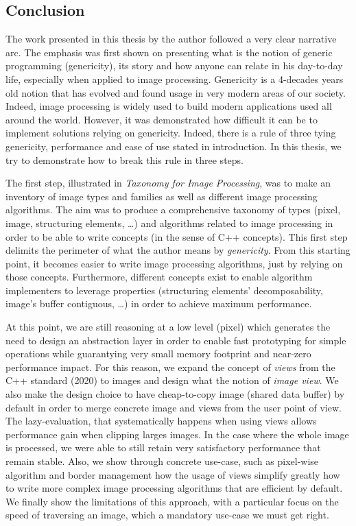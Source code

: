 \subsection*{Conclusion}


The work presented in this thesis by the author followed a very clear narrative arc. The emphasis was first shown on
presenting what is the notion of generic programming (genericity), its story and how anyone can relate in his day-to-day
life, especially when applied to image processing. Genericity is a 4-decades years old notion that has evolved and found
usage in very modern areas of our society. Indeed, image processing is widely used to build modern applications used all
around the world. However, it was demonstrated how difficult it can be to implement solutions relying on genericity.
Indeed, there is a rule of three tying genericity, performance and ease of use stated in introduction. In this thesis,
we try to demonstrate how to break this rule in three steps.

The first step, illustrated in \emph{Taxonomy for Image Processing}, was to make an inventory of image types and
families as well as different image processing algorithms. The aim was to produce a comprehensive taxonomy of types
(pixel, image, structuring elements, \ldots) and algorithms related to image processing in order to be able to write
concepts (in the sense of C++ concepts). This first step delimits the perimeter of what the author means by
\emph{genericity}. From this starting point, it becomes easier to write image processing algorithms, just by relying on
those concepts. Furthermore, different concepts exist to enable algorithm implementers to leverage properties
(structuring elements' decomposability, image's buffer contiguous, \ldots) in order to achieve maximum performance.

At this point, we are still reasoning at a low level (pixel) which generates the need to design an abstraction layer in
order to enable fast prototyping for simple operations while guarantying very small memory footprint and near-zero
performance impact. For this reason, we expand the concept of \emph{views} from the C++ standard (2020) to images and
design what the notion of \emph{image view}. We also make the design choice to have cheap-to-copy image (shared data
buffer) by default in order to merge concrete image and views from the user point of view. The lazy-evaluation, that
systematically happens when using views allows performance gain when clipping larges images. In the case where the whole
image is processed, we were able to still retain very satisfactory performance that remain stable. Also, we show through
concrete use-case, such as pixel-wise algorithm and border management how the usage of views simplify greatly how to
write more complex image processing algorithms that are efficient by default. We finally show the limitations of this
approach, with a particular focus on the speed of traversing an image, which a mandatory use-case we must get right.

